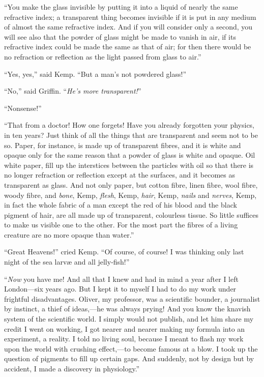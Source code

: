 “You make the glass invisible by putting it into a liquid of nearly the same refractive index; a transparent thing becomes invisible if it is put in any medium of almost the same refractive index. And if you will consider only a second, you will see also that the powder of glass might be made to vanish in air, if its refractive index could be made the same as that of air; for then there would be no refraction or reflection as the light passed from glass to air.”

“Yes, yes,” said Kemp. “But a man’s not powdered glass!”

“No,” said Griffin. “\emph{He’s more transparent!}”

“Nonsense!”

“That from a doctor! How one forgets! Have you already forgotten your physics, in ten years? Just think of all the things that are transparent and seem not to be so. Paper, for instance, is made up of transparent fibres, and it is white and opaque only for the same reason that a powder of glass is white and opaque. Oil white paper, fill up the interstices between the particles with oil so that there is no longer refraction or reflection except at the surfaces, and it becomes as transparent as glass. And not only paper, but cotton fibre, linen fibre, wool fibre, woody fibre, and \emph{bone}, Kemp, \emph{flesh}, Kemp, \emph{hair}, Kemp, \emph{nails} and \emph{nerves}, Kemp, in fact the whole fabric of a man except the red of his blood and the black pigment of hair, are all made up of transparent, colourless tissue. So little suffices to make us visible one to the other. For the most part the fibres of a living creature are no more opaque than water.”

“Great Heavens!” cried Kemp. “Of course, of course! I was thinking only last night of the sea larvæ and all jelly-fish!”

“\emph{Now} you have me! And all that I knew and had in mind a year after I left London—six years ago. But I kept it to myself I had to do my work under frightful disadvantages. Oliver, my professor, was a scientific bounder, a journalist by instinct, a thief of ideas,—he was always prying! And you know the knavish system of the scientific world. I simply would not publish, and let him share my credit I went on working, I got nearer and nearer making my formula into an experiment, a reality. I told no living soul, because I meant to flash my work upon the world with crushing effect,—to become famous at a blow. I took up the question of pigments to fill up certain gaps. And suddenly, not by design but by accident, I made a discovery in physiology.”

